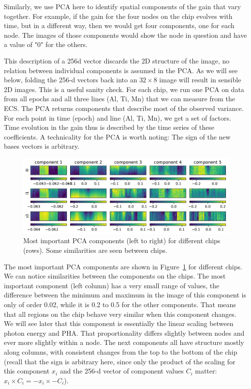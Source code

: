 \documentclass[]{spie}  %
\begin{document}
Similarly, we use PCA here to identify spatial components of the gain that vary together. For example, if the gain for the four nodes on the chip evolves with time, but in a different way, then we would get four components, one for each node. The images of those components would show the node in question and have a value of "0" for the others.

This description of a 256d vector discards the 2D structure of the image, no relation between individual components is assumed in the PCA. As we will see below, folding the 256-d vectors back into an $32 \times 8$ image will result in sensible 2D images. This is a useful sanity check.
For each chip, we run one PCA on data from all epochs and all three lines (Al, Ti, Mn) that we can measure from the ECS. The PCA returns components that describe most of the observed variance. For each point in time (epoch) and line (Al, Ti, Mn), we get a set of factors. Time evolution in the gain thus is described by the time series of these coefficients.
A technicality for the PCA is worth noting: The sign of the new bases vectors is arbitrary. 


\begin{figure} [ht]
  \begin{center}
    \includegraphics[width=\textwidth]{figures/components.pdf}
  \end{center}
  \caption
      {Most important PCA components (left to right) for different chips (rows). Some similarities are seen between chips. \label{fig:components}}
\end{figure}

The most important PCA components are shown in Figure~\ref{fig:components} for different chips. We can notice similarities between the components on the chips. The most important component (left column) has a very small range of values, the difference between the minimum and maximum in the image of this component is only of order 0.02, while it is 0.2 to 0.5 for the other components. That means that all regions on the chip behave very similar when this component changes. We will see later that this component is essentially the linear scaling between photon energy and PHA. That proportionality differs slightly between nodes and ever more slightly within a node. The next components all have structure mostly along columns, with consistent changes from the top to the bottom of the chip
(recall that the sign is arbitrary here, since only the product of the scaling for this component $x_i$ and the 256-d vector of component values $C_i$ matter: $x_i \times C_i = -x_i \times -C_i$).
\end{document}
